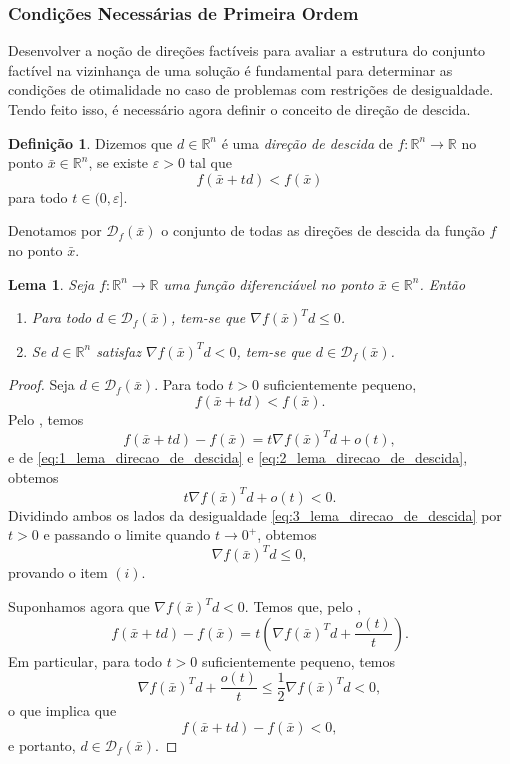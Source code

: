 \documentclass[12pt,a4paper]{scrartcl}
\def\RR{\mathds{R}}
\def\xbar{\bar{x}}
\newtheorem{lema}{Lema}
\theoremstyle{definition}%
\newtheorem{defi}{Definição}
\begin{document}
\subsubsection{Condições Necessárias de Primeira Ordem}


Desenvolver a noção de direções factíveis para avaliar a estrutura do conjunto factível na vizinhança de uma solução é fundamental para determinar as condições de otimalidade no caso de problemas com restrições de desigualdade. Tendo feito isso, é necessário agora definir o conceito de direção de descida.


\begin{defi} \label{defi:direcao_de_descida}
Dizemos que $d\in \RR^{n}$ é uma \emph{direção de descida} de $f:\RR^{n} \rightarrow \RR$ no ponto $\xbar \in \RR^{n}$, se existe $\varepsilon >0$ tal que
\[
f(\xbar + td) <f(\xbar)
\]
para todo $t \in (0,\varepsilon ]$.
\end{defi}
Denotamos por $\mathcal{D}_{f}(\xbar)$ o conjunto de todas as direções de descida da função $f$ no ponto $\xbar$.


\begin{lema} \label{lema:direcao_de_descida}
Seja $f:\RR^{n} \rightarrow \RR$ uma função diferenciável no ponto $\xbar \in \RR^{n}$. Então
\begin{enumerate}
	\item[(i)] Para todo $d \in \mathcal{D}_{f}(\xbar)$, tem-se que $\nabla f(\xbar)^{T}d \leq 0$.

	\item[(ii)] Se $d\in \RR^{n}$ satisfaz $\nabla f(\xbar)^{T}d < 0$, tem-se que $d \in \mathcal{D}_{f}(\xbar)$.
\end{enumerate}	
\end{lema}
\begin{proof}
Seja $d \in \mathcal{D}_{f}(\xbar)$. Para todo $t>0$ suficientemente pequeno, 
\[ \label{eq:1_lema_direcao_de_descida}
f(\xbar + td) < f(\xbar).
\]
Pelo , temos
\[ \label{eq:2_lema_direcao_de_descida}
f(\xbar + td) - f(\xbar) = t\nabla f(\xbar)^{T} d + o(t),
\] 
e de \eqref{eq:1_lema_direcao_de_descida} e \eqref{eq:2_lema_direcao_de_descida}, obtemos
\[ \label{eq:3_lema_direcao_de_descida}
t\nabla f(\xbar)^{T}d + o(t) < 0.
\]
Dividindo ambos os lados da desigualdade \eqref{eq:3_lema_direcao_de_descida} por $t>0$ e passando o limite quando $t \rightarrow 0^{+}$, obtemos
\[
\nabla f(\xbar)^{T}d \leq 0,
\]
provando o item $(i)$.

Suponhamos agora que $\nabla f(\xbar)^{T}d <0$. Temos que, pelo ,
\[
f(\xbar + td) - f(\xbar) = t\left( \nabla f(\xbar)^{T}d + \dfrac{o(t)}{t} \right) .
\]
Em particular, para todo $t>0$ suficientemente pequeno, temos
\[
\nabla f(\xbar)^{T}d + \dfrac{o(t)}{t} \leq \dfrac{1}{2} \nabla f(\xbar)^{T}d <0,
\]
o que implica que
\[
f(\xbar + td) - f(\xbar) <0,
\]
e portanto, $d \in \mathcal{D}_{f}(\xbar)$.
\end{proof}
\end{document}
